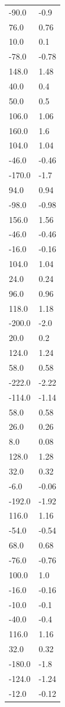 \begin{longtable}{ll}
-90.0 & -0.9 \\
76.0 & 0.76 \\
10.0 & 0.1 \\
-78.0 & -0.78 \\
148.0 & 1.48 \\
40.0 & 0.4 \\
50.0 & 0.5 \\
106.0 & 1.06 \\
160.0 & 1.6 \\
104.0 & 1.04 \\
-46.0 & -0.46 \\
-170.0 & -1.7 \\
94.0 & 0.94 \\
-98.0 & -0.98 \\
156.0 & 1.56 \\
-46.0 & -0.46 \\
-16.0 & -0.16 \\
104.0 & 1.04 \\
24.0 & 0.24 \\
96.0 & 0.96 \\
118.0 & 1.18 \\
-200.0 & -2.0 \\
20.0 & 0.2 \\
124.0 & 1.24 \\
58.0 & 0.58 \\
-222.0 & -2.22 \\
-114.0 & -1.14 \\
58.0 & 0.58 \\
26.0 & 0.26 \\
8.0 & 0.08 \\
128.0 & 1.28 \\
32.0 & 0.32 \\
-6.0 & -0.06 \\
-192.0 & -1.92 \\
116.0 & 1.16 \\
-54.0 & -0.54 \\
68.0 & 0.68 \\
-76.0 & -0.76 \\
100.0 & 1.0 \\
-16.0 & -0.16 \\
-10.0 & -0.1 \\
-40.0 & -0.4 \\
116.0 & 1.16 \\
32.0 & 0.32 \\
-180.0 & -1.8 \\
-124.0 & -1.24 \\
-12.0 & -0.12 \\

\end{longtable}
